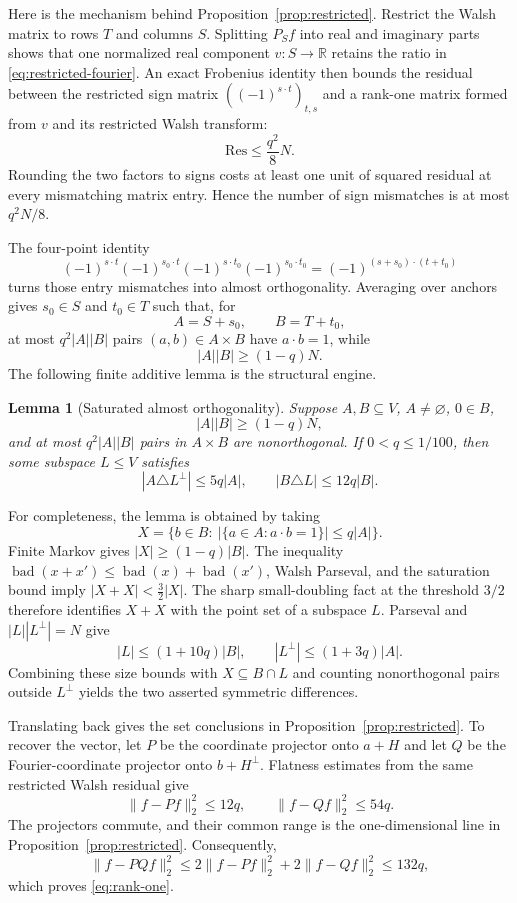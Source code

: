 \documentclass[11pt]{article}
\newtheorem{lemma}[theorem]{Lemma}
\theoremstyle{remark}
\newcommand{\1}{\mathbf 1}
\begin{document}
Here is the mechanism behind Proposition~\ref{prop:restricted}. Restrict the
Walsh matrix to rows $T$ and columns $S$. Splitting $P_Sf$ into real and
imaginary parts shows that one normalized real component $v:S\to\mathbb R$
retains the ratio in \eqref{eq:restricted-fourier}. An exact Frobenius
identity then bounds the residual between the restricted sign matrix
$((-1)^{s\cdot t})_{t,s}$ and a rank-one matrix formed from $v$ and its
restricted Walsh transform:
\[
  \mathrm{Res}\leq \frac{q^2}{8}N.
\]
Rounding the two factors to signs costs at least one unit of squared residual
at every mismatching matrix entry. Hence the number of sign mismatches is at
most $q^2N/8$.

The four-point identity
\[
 (-1)^{s\cdot t}(-1)^{s_0\cdot t}
 (-1)^{s\cdot t_0}(-1)^{s_0\cdot t_0}
 =(-1)^{(s+s_0)\cdot(t+t_0)}
\]
turns those entry mismatches into almost orthogonality. Averaging over
anchors gives $s_0\in S$ and $t_0\in T$ such that, for
\[
  A=S+s_0,\qquad B=T+t_0,
\]
at most $q^2|A||B|$ pairs $(a,b)\in A\times B$ have $a\cdot b=1$, while
\[
  |A||B|\geq(1-q)N.
\]
The following finite additive lemma is the structural engine.

\begin{lemma}[Saturated almost orthogonality]\label{lem:saturated}
Suppose $A,B\subseteq V$, $A\neq\varnothing$, $0\in B$,
\[
  |A||B|\geq(1-q)N,
\]
and at most $q^2|A||B|$ pairs in $A\times B$ are nonorthogonal. If
$0<q\leq1/100$, then some subspace $L\leq V$ satisfies
\[
  |A\triangle L^\perp|\leq5q|A|,
  \qquad
  |B\triangle L|\leq12q|B|.
\]
\end{lemma}

For completeness, the lemma is obtained by taking
\[
  X=\{b\in B:\ |\{a\in A:a\cdot b=1\}|\leq q|A|\}.
\]
Finite Markov gives $|X|\geq(1-q)|B|$. The inequality
$\operatorname{bad}(x+x')\leq\operatorname{bad}(x)+
\operatorname{bad}(x')$, Walsh Parseval, and the saturation bound imply
$|X+X|<\tfrac32|X|$. The sharp small-doubling fact at the threshold $3/2$
therefore identifies $X+X$ with the point set of a subspace $L$.
Parseval and $|L||L^\perp|=N$ give
\[
  |L|\leq(1+10q)|B|,
  \qquad |L^\perp|\leq(1+3q)|A|.
\]
Combining these size bounds with $X\subseteq B\cap L$ and counting
nonorthogonal pairs outside $L^\perp$ yields the two asserted symmetric
differences.

Translating back gives the set conclusions in
Proposition~\ref{prop:restricted}. To recover the vector, let $P$ be the
coordinate projector onto $a+H$ and let $Q$ be the Fourier-coordinate
projector onto $b+H^\perp$. Flatness estimates from the same restricted
Walsh residual give
\[
  \|f-Pf\|_2^2\leq12q,\qquad
  \|f-Qf\|_2^2\leq54q.
\]
The projectors commute, and their common range is the one-dimensional line
in Proposition~\ref{prop:restricted}. Consequently,
\[
 \|f-PQf\|_2^2
 \leq2\|f-Pf\|_2^2+2\|f-Qf\|_2^2
 \leq132q,
\]
which proves \eqref{eq:rank-one}.
\end{document}
